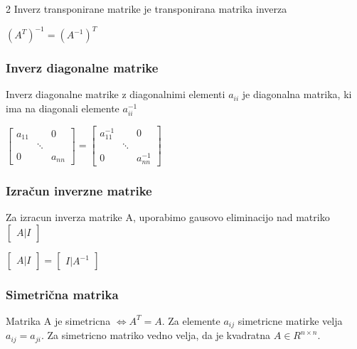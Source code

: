 \documentclass{article}
\begin{document}
\begin{multicols}{2}
	Inverz transponirane matrike je transponirana matrika inverza
	\begin{center}
		$(A^{T})^{-1} = (A^{-1})^{T}$
	\end{center}

	\subsubsection{Inverz diagonalne matrike}

	Inverz diagonalne matrike z diagonalnimi elementi $a_{ii}$ je
	diagonalna matrika, ki ima na diagonali elemente $a_{ii}^{-1}$
	\begin{center}
		$\begin{bmatrix}
				a_{11} &        & 0      \\
				       & \ddots &        \\
				0      &        & a_{nn}
			\end{bmatrix}=
			\begin{bmatrix}
				a_{11}^{-1} &        & 0           \\
				            & \ddots &             \\
				0           &        & a_{nn}^{-1}
			\end{bmatrix}
		$
	\end{center}

	\subsubsection{Izračun inverzne matrike}

	Za izracun inverza matrike A, uporabimo gausovo eliminacijo nad
	matriko $\begin{bmatrix}A|I\end{bmatrix}$
	\begin{center}
		$\begin{bmatrix}A|I\end{bmatrix} =
			\begin{bmatrix}I|A^{-1}\end{bmatrix}
		$
	\end{center}

	\subsubsection{Simetrična matrika}

	Matrika A je simetricna $\Leftrightarrow A^{T} = A$. Za elemente
	$a_{ij}$ simetricne matirke velja $a_{ij} = a_{ji}$. Za simetricno matriko vedno velja,
	da je kvadratna $A \in R^{n \times n}$.


\end{multicols}
\end{document}
